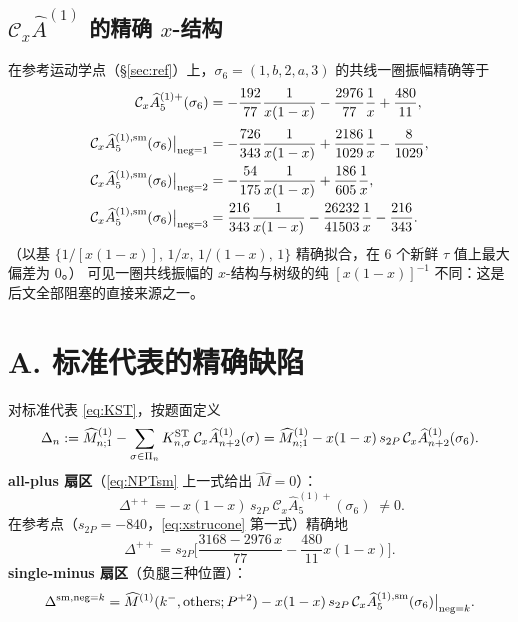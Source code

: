 \documentclass[11pt]{article}
\newcommand{\Cx}{\mathcal{C}_x}
\newcommand{\Mhat}{\widehat{M}}
\newcommand{\Ahat}{\widehat{A}}
\newcommand{\Pt}{P}
\begin{document}
\subsection{$\Cx\Ahat^{(1)}$ 的精确 $x$-结构}
在参考运动学点（\S\ref{sec:ref}）上，$\sigma_6=(1,b,2,a,3)$ 的共线一圈振幅精确等于
\begin{equation}
\begin{aligned}
\Cx\Ahat^{(1)+}_5(\sigma_6)&=-\frac{192}{77}\frac{1}{x(1-x)}-\frac{2976}{77}\frac1x+\frac{480}{11},\\[1mm]
\Cx\Ahat^{(1),\rm sm}_5(\sigma_6)\big|_{\text{neg}=1}&=-\frac{726}{343}\frac{1}{x(1-x)}+\frac{2186}{1029}\frac1x-\frac{8}{1029},\\
\Cx\Ahat^{(1),\rm sm}_5(\sigma_6)\big|_{\text{neg}=2}&=-\frac{54}{175}\frac{1}{x(1-x)}+\frac{186}{605}\frac1x,\\
\Cx\Ahat^{(1),\rm sm}_5(\sigma_6)\big|_{\text{neg}=3}&=\frac{216}{343}\frac{1}{x(1-x)}-\frac{26232}{41503}\frac1x-\frac{216}{343}.
\end{aligned}
\label{eq:xstrucone}
\end{equation}
（以基 $\{1/[x(1-x)],\,1/x,\,1/(1-x),\,1\}$ 精确拟合，在 $6$ 个新鲜 $\tau$ 值上最大偏差为 $0$。）
可见一圈共线振幅的 $x$-结构与树级的纯 $[x(1-x)]^{-1}$ 不同：这是后文全部阻塞的直接来源之一。

\section{A. 标准代表的精确缺陷}
\label{sec:defect}

对标准代表 \eqref{eq:KST}，按题面定义
\begin{equation}
\Delta_n:=\Mhat^{(1)}_{n;1}-\sum_{\sigma\in\Pi_n}K^{\rm ST}_{n,\sigma}\,\Cx\Ahat^{(1)}_{n+2}(\sigma)
=\Mhat^{(1)}_{n;1}-x(1-x)\,s_{2\Pt}\,\Cx\Ahat^{(1)}_{n+2}(\sigma_6).
\end{equation}
\textbf{all-plus 扇区}（\eqref{eq:NPTsm} 上一式给出 $\Mhat=0$）：
\begin{equation}
\boxed{\;\Delta^{++}=-\,x(1-x)\,s_{2\Pt}\;\Cx\Ahat^{(1)+}_5(\sigma_6)\;}\neq 0 .
\label{eq:Dpp}
\end{equation}
在参考点（$s_{2\Pt}=-840$，\eqref{eq:xstrucone} 第一式）精确地
\begin{equation}
\Delta^{++}=s_{2\Pt}\Big[\frac{3168-2976\,x}{77}-\frac{480}{11}x(1-x)\Big].
\end{equation}
\textbf{single-minus 扇区}（负腿三种位置）：
\begin{equation}
\Delta^{{\rm sm},\text{neg}=k}=\Mhat^{(1)}(k^-,{\rm others};\Pt^{+2})
-x(1-x)\,s_{2\Pt}\,\Cx\Ahat^{(1),\rm sm}_5(\sigma_6)\big|_{\text{neg}=k}.
\label{eq:Dsm}
\end{equation}
\end{document}
